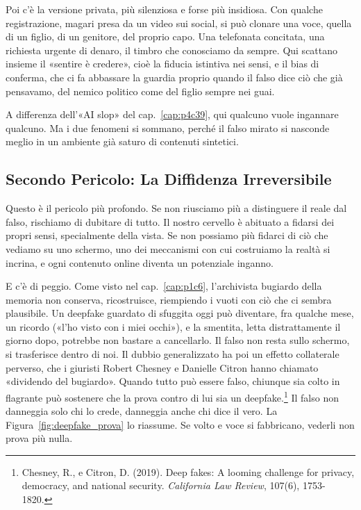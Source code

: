 Poi c'è la versione privata, più silenziosa e forse più insidiosa. Con qualche registrazione, magari presa da un video sui social, si può clonare una voce, quella di un figlio, di un genitore, del proprio capo. Una telefonata concitata, una richiesta urgente di denaro, il timbro che conosciamo da sempre. Qui scattano insieme il «sentire è credere», cioè la fiducia istintiva nei sensi, e il bias di conferma, che ci fa abbassare la guardia proprio quando il falso dice ciò che già pensavamo, del nemico politico come del figlio sempre nei guai.

A differenza dell'«AI slop» del cap.~\ref{cap:p4c39}, qui qualcuno vuole ingannare qualcuno. Ma i due fenomeni si sommano, perché il falso mirato si nasconde meglio in un ambiente già saturo di contenuti sintetici.

\subsection{Secondo Pericolo: La Diffidenza Irreversibile}
Questo è il pericolo più profondo. Se non riusciamo più a distinguere il reale dal falso, rischiamo di dubitare di tutto. Il nostro cervello è abituato a fidarsi dei propri sensi, specialmente della vista. Se non possiamo più fidarci di ciò che vediamo su uno schermo, uno dei meccanismi con cui costruiamo la realtà si incrina, e ogni contenuto online diventa un potenziale inganno.

E c'è di peggio. Come visto nel cap.~\ref{cap:p1c6}, l'archivista bugiardo della memoria non conserva, ricostruisce, riempiendo i vuoti con ciò che ci sembra plausibile. Un deepfake guardato di sfuggita oggi può diventare, fra qualche mese, un ricordo («l'ho visto con i miei occhi»), e la smentita, letta distrattamente il giorno dopo, potrebbe non bastare a cancellarlo. Il falso non resta sullo schermo, si trasferisce dentro di noi. Il dubbio generalizzato ha poi un effetto collaterale perverso, che i giuristi Robert Chesney e Danielle Citron hanno chiamato «dividendo del bugiardo». Quando tutto può essere falso, chiunque sia colto in flagrante può sostenere che la prova contro di lui sia un deepfake.\footnote{Chesney, R., e Citron, D. (2019). Deep fakes: A looming challenge for privacy, democracy, and national security. \textit{California Law Review}, 107(6), 1753-1820.} Il falso non danneggia solo chi lo crede, danneggia anche chi dice il vero. La Figura~\ref{fig:deepfake_prova} lo riassume. Se volto e voce si fabbricano, vederli non prova più nulla.


